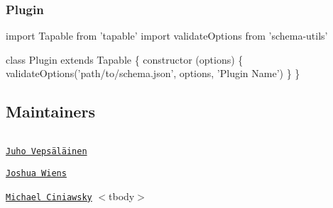 \subsubsection*{Plugin}


\begin{DoxyCode}
import Tapable from 'tapable'
import validateOptions from 'schema-utils'

class Plugin extends Tapable \{
  constructor (options) \{
    validateOptions('path/to/schema.json', options, 'Plugin Name')
  \}
\}
\end{DoxyCode}


\subsection*{Maintainers}

\tabulinesep=1mm
\begin{longtabu} spread 0pt [c]{*{0}{|X[-1]}|}
\hline
\end{longtabu}


  \href{https://github.com/bebraw}{\tt Juho Vepsäläinen}  

  \href{https://github.com/d3viant0ne}{\tt Joshua Wiens}  

  \href{https://github.com/michael-ciniawsky}{\tt Michael Ciniawsky}   $<$tbody$>$ 